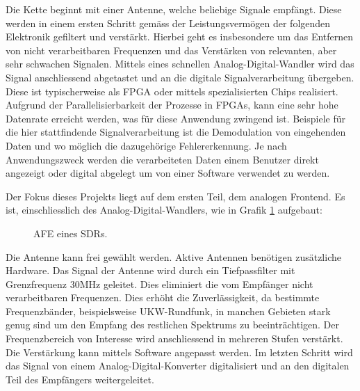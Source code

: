 Die Kette beginnt mit einer Antenne, welche beliebige Signale empfängt. Diese werden in einem ersten Schritt gemäss der Leistungsvermögen der folgenden Elektronik gefiltert und verstärkt. Hierbei geht es insbesondere um das Entfernen von nicht verarbeitbaren Frequenzen und das Verstärken von relevanten, aber sehr schwachen Signalen. Mittels eines schnellen Analog-Digital-Wandler wird das Signal anschliessend abgetastet und an die digitale Signalverarbeitung übergeben. Diese ist typischerweise als FPGA oder mittels spezialisierten Chips realisiert. Aufgrund der Parallelisierbarkeit der Prozesse in FPGAs, kann eine sehr hohe Datenrate erreicht werden, was für diese Anwendung zwingend ist. Beispiele für die hier stattfindende Signalverarbeitung ist die Demodulation von eingehenden Daten und wo möglich die dazugehörige Fehlererkennung. Je nach Anwendungszweck werden die verarbeiteten Daten einem Benutzer direkt angezeigt oder digital abgelegt um von einer Software verwendet zu werden.

Der Fokus dieses Projekts liegt auf dem ersten Teil, dem analogen Frontend. Es ist, einschliesslich des Analog-Digital-Wandlers, wie in Grafik \ref{fig:AFE_aufbau} aufgebaut:

\begin{figure}[H]
\begin{center}
    \caption{AFE eines SDRs.}
    \label{fig:AFE_aufbau}
\end{center}
\end{figure}

Die Antenne kann frei gewählt werden. Aktive Antennen benötigen zusätzliche Hardware. Das Signal der Antenne wird durch ein Tiefpassfilter mit Grenzfrequenz 30MHz geleitet. Dies eliminiert die vom Empfänger nicht verarbeitbaren Frequenzen. Dies erhöht die Zuverlässigkeit, da bestimmte Frequenzbänder, beispielsweise UKW-Rundfunk, in manchen Gebieten stark genug sind um den Empfang des restlichen Spektrums zu beeinträchtigen.
Der Frequenzbereich von Interesse wird anschliessend in mehreren Stufen verstärkt. Die Verstärkung kann mittels Software angepasst werden. Im letzten Schritt wird das Signal von einem Analog-Digital-Konverter digitalisiert und an den digitalen Teil des Empfängers weitergeleitet.